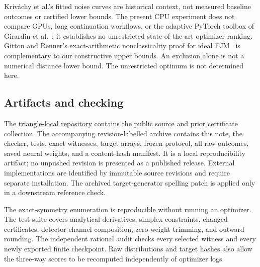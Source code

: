 \documentclass[10pt]{article}
\begin{document}
Kriv\'achy et al.'s fitted noise curves are historical context, not measured
baseline outcomes or certified lower bounds. The present CPU experiment does
not compare GPUs, long continuation workflows, or the adaptive PyTorch toolbox
of Girardin et al.~\cite{girardin}; it establishes no unrestricted
state-of-the-art optimizer ranking. Gitton and Renner's exact-arithmetic
nonclassicality proof for ideal EJM~\cite{gitton} is complementary to our
constructive upper bounds. An exclusion alone is not a numerical distance
lower bound. The unrestricted optimum is not determined here.

\newpage
\subsection*{Artifacts and checking}
The \href{https://github.com/the-omega-institute/triangle-local}{triangle-local repository}
contains the public source and prior certificate collection. The accompanying
revision-labelled archive contains this note, the checker, tests, exact
witnesses, target arrays, frozen protocol, all raw outcomes, saved neural
weights, and a content-hash manifest. It is a local reproducibility artifact;
no unpushed revision is presented as a published release. External implementations
are identified by immutable source revisions and require separate installation.
The archived target-generator spelling patch is applied only in a downstream
reference check.

The exact-symmetry enumeration is reproducible without running an optimizer.
The test suite covers analytical derivatives, simplex constraints, changed
certificates, detector-channel composition, zero-weight trimming, and outward
rounding. The independent rational audit checks every selected witness and
every newly exported finite checkpoint. Raw distributions and target hashes
also allow the three-way scores to be recomputed independently of optimizer logs.



\end{document}

